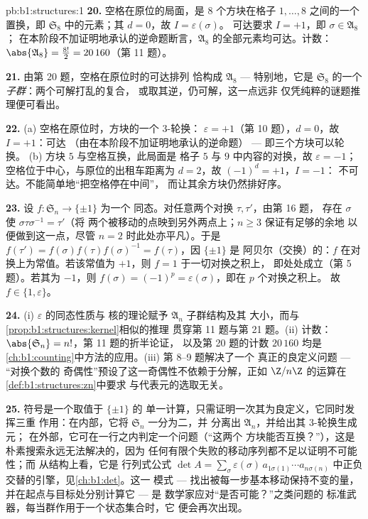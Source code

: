 \begin{solution}{pb:b1:structures:1}
\textbf{20.} 空格在原位的局面，是
$8$ 个方块在格子 $1, \dots, 8$ 之间的一个置换，即
$\mathfrak S_8$ 中的元素；其 $d = 0$，故 $I = \varepsilon(\sigma)$。
可达要求 $I = +1$，即 $\sigma \in \mathfrak A_8$；
在本阶段不加证明地承认的逆命题断言，$\mathfrak A_8$ 的全部元素均可达。计数：
$\abs{\mathfrak A_8} = \frac{8!}2 = 20\,160$（第 11 题）。

\textbf{21.} 由第 20 题，空格在原位时的可达排列
恰构成 $\mathfrak A_8$ --- 特别地，它是 $\mathfrak S_8$ 的一个
\emph{子群}：两个可解打乱的复合，
或取其逆，仍可解，这一点远非
仅凭纯粹的谜题推理便可看出。

\textbf{22.} (a) 空格在原位时，方块的一个 $3$-轮换：
$\varepsilon = +1$（第 10 题），$d = 0$，故 $I = +1$：可达
（由在本阶段不加证明地承认的逆命题） --- 即三个方块可以轮换。
(b) 方块 $5$ 与空格互换，此局面是
格子 $5$ 与 $9$ 中内容的对换，故
$\varepsilon = -1$；空格位于中心，与原位的出租车距离为
$d = 2$，故 $(-1)^d = +1$，$I = -1$：
不可达。不能简单地“把空格停在中间”，
而让其余方块仍然排好序。

\textbf{23.} 设 $f \colon \mathfrak S_n \to \{\pm1\}$ 为一个
同态。对任意两个对换 $\tau, \tau'$，由第 16 题，
存在 $\sigma$ 使 $\sigma\tau\sigma^{-1} = \tau'$（将
两个被移动的点映到另外两点上；$n \geq 3$ 保证有足够的余地
以便做到这一点，尽管 $n = 2$ 时此处亦平凡）。于是 $f(\tau') =
f(\sigma)f(\tau)f(\sigma)^{-1} = f(\tau)$，因 $\{\pm1\}$ 是
阿贝尔（交换）的：$f$ 在对换上为常值。若该常值为
$+1$，则 $f = 1$ 于一切对换之积上，
即处处成立（第 5 题）。若其为 $-1$，则 $f(\sigma) =
(-1)^p = \varepsilon(\sigma)$，即在 $p$ 个对换之积上。
故 $f \in \{1, \varepsilon\}$。

\textbf{24.} (i) $\varepsilon$ 的同态性质与
核的理论赋予 $\mathfrak A_n$ 子群结构及其
大小，而与\cref{prop:b1:structures:kernel}相似的推理
贯穿第 11 题与第 21 题。(ii) 计数：
$\abs{\mathfrak S_n} = n!$，第 11 题的折半论证，
以及第 20 题的计数 $20\,160$ 均是
\cref{ch:b1:counting}中方法的应用。(iii) 第 8--9 题解决了一个
真正的良定义问题 --- “对换个数的
奇偶性”预设了这一奇偶性不依赖于分解，正如
$\Z/n\Z$ 的运算在\cref{def:b1:structures:zn}中要求
与代表元的选取无关。

\textbf{25.} 符号是一个取值于 $\{\pm1\}$ 的
单一计算，只需证明一次其为良定义，它同时发挥三重
作用：在内部，它将 $\mathfrak S_n$ 一分为二，并
分离出 $\mathfrak A_n$，并给出其 $3$-轮换生成元；
在外部，它可在一行之内判定一个问题（“这两个
方块能否互换？”），这是朴素搜索永远无法解决的，因为
任何有限个失败的移动序列都不足以证明不可能性；而
从结构上看，它是
行列式公式 $\det A = \sum_\sigma \varepsilon(\sigma)\,
a_{1\sigma(1)}\cdots a_{n\sigma(n)}$ 中正负交替的引擎，见\cref{ch:b1:det}。这一
模式 --- 找出被每一步基本移动保持不变的量，
并在起点与目标处分别计算它 --- 是
数学家应对“是否可能？”之类问题的
标准武器，每当群作用于一个状态集合时，它
便会再次出现。
\end{solution}
